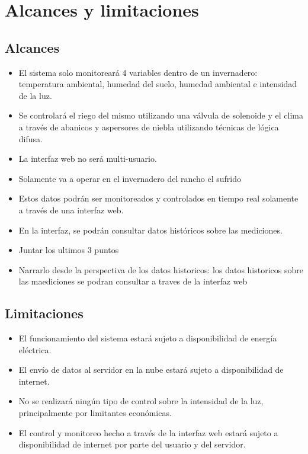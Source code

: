 \section{Alcances y limitaciones}

\subsection*{Alcances}
\begin{itemize}
    \item El sistema solo monitoreará 4 variables dentro de un invernadero: temperatura ambiental, humedad del suelo, humedad ambiental e intensidad de la luz.
    \item Se controlará el riego del mismo utilizando una válvula de solenoide y el clima a través de abanicos y aspersores de niebla utilizando técnicas de lógica difusa. 
    \item La interfaz web no será multi-usuario.
    \item Solamente va a operar en el invernadero del rancho el sufrido
    \item Estos datos podrán ser monitoreados y controlados en tiempo real solamente a través de una interfaz web.
    \item En la interfaz, se podrán consultar datos históricos sobre las mediciones.
    \item Juntar los ultimos 3 puntos
    \item Narrarlo desde la perspectiva de los datos historicos: los datos historicos sobre las maediciones se podran consultar a traves de la interfaz web
\end{itemize}

\subsection*{Limitaciones}
\begin{itemize}
    \item El funcionamiento del sistema estará sujeto a disponibilidad de energía eléctrica.
    \item El envío de datos al servidor en la nube estará sujeto a disponibilidad de internet.
    \item No se realizará ningún tipo de control sobre la intensidad de la luz, principalmente por limitantes económicas.
    \item El control y monitoreo hecho a través de la interfaz web estará sujeto a disponibilidad de internet por parte del usuario y del servidor.
\end{itemize}

